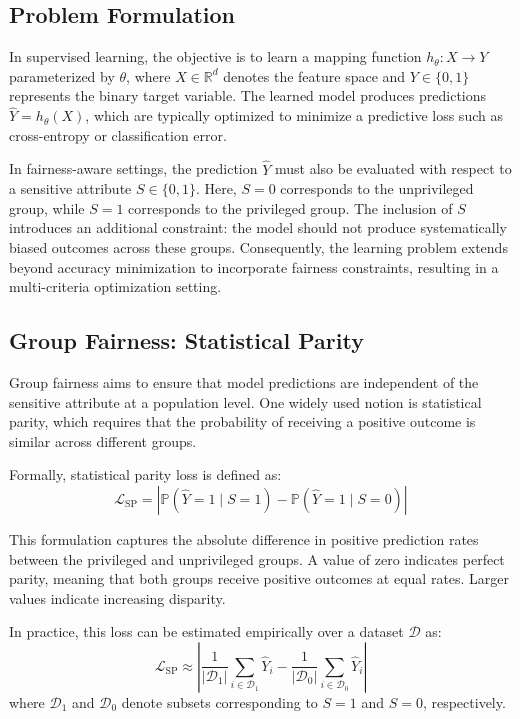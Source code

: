 \documentclass[12pt,a4paper]{article}
\begin{document}
\subsection{Problem Formulation}

In supervised learning, the objective is to learn a mapping function $h_{\theta}: X \rightarrow Y$ parameterized by $\theta$, where $X \in \mathbb{R}^d$ denotes the feature space and $Y \in \{0,1\}$ represents the binary target variable. The learned model produces predictions $\hat{Y} = h_{\theta}(X)$, which are typically optimized to minimize a predictive loss such as cross-entropy or classification error.

In fairness-aware settings, the prediction $\hat{Y}$ must also be evaluated with respect to a sensitive attribute $S \in \{0,1\}$. Here, $S=0$ corresponds to the unprivileged group, while $S=1$ corresponds to the privileged group. The inclusion of $S$ introduces an additional constraint: the model should not produce systematically biased outcomes across these groups. Consequently, the learning problem extends beyond accuracy minimization to incorporate fairness constraints, resulting in a multi-criteria optimization setting.

\subsection{Group Fairness: Statistical Parity}

Group fairness aims to ensure that model predictions are independent of the sensitive attribute at a population level. One widely used notion is statistical parity, which requires that the probability of receiving a positive outcome is similar across different groups.

Formally, statistical parity loss is defined as:
\begin{equation}
    \mathcal{L}_{\text{SP}} = \left| \mathbb{P}(\hat{Y}=1 \mid S=1) - \mathbb{P}(\hat{Y}=1 \mid S=0) \right|
\end{equation}

This formulation captures the absolute difference in positive prediction rates between the privileged and unprivileged groups. A value of zero indicates perfect parity, meaning that both groups receive positive outcomes at equal rates. Larger values indicate increasing disparity.

In practice, this loss can be estimated empirically over a dataset $\mathcal{D}$ as:
\begin{equation}
    \mathcal{L}_{\text{SP}} \approx 
    \left|
    \frac{1}{|\mathcal{D}_{1}|} \sum_{i \in \mathcal{D}_{1}} \hat{Y}_i
    -
    \frac{1}{|\mathcal{D}_{0}|} \sum_{i \in \mathcal{D}_{0}} \hat{Y}_i
    \right|
\end{equation}
where $\mathcal{D}_{1}$ and $\mathcal{D}_{0}$ denote subsets corresponding to $S=1$ and $S=0$, respectively.
\end{document}
